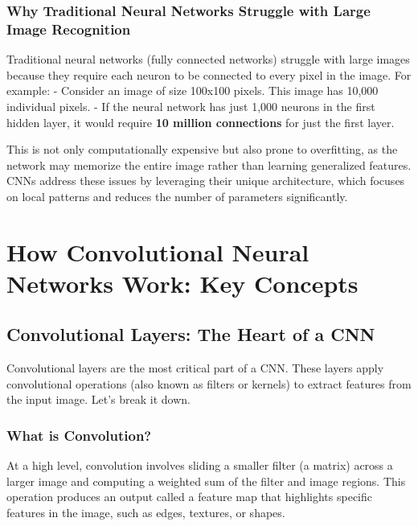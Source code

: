 \documentclass[
  letterpaper,
  DIV=11,
  numbers=noendperiod]{scrreprt}
\begin{document}
\subsubsection{Why Traditional Neural Networks Struggle with Large Image
Recognition}\label{why-traditional-neural-networks-struggle-with-large-image-recognition}

Traditional neural networks (fully connected networks) struggle with
large images because they require each neuron to be connected to every
pixel in the image. For example: - Consider an image of size 100x100
pixels. This image has 10,000 individual pixels. - If the neural network
has just 1,000 neurons in the first hidden layer, it would require
\textbf{10 million connections} for just the first layer.

This is not only computationally expensive but also prone to
overfitting, as the network may memorize the entire image rather than
learning generalized features. CNNs address these issues by leveraging
their unique architecture, which focuses on local patterns and reduces
the number of parameters significantly.

\section{How Convolutional Neural Networks Work: Key
Concepts}\label{how-convolutional-neural-networks-work-key-concepts}

\subsection{Convolutional Layers: The Heart of a
CNN}\label{convolutional-layers-the-heart-of-a-cnn}

Convolutional layers are the most critical part of a CNN. These layers
apply convolutional operations (also known as filters or kernels) to
extract features from the input image. Let's break it down.

\subsubsection{What is Convolution?}\label{what-is-convolution}

At a high level, convolution involves sliding a smaller filter (a
matrix) across a larger image and computing a weighted sum of the filter
and image regions. This operation produces an output called a feature
map that highlights specific features in the image, such as edges,
textures, or shapes.
\end{document}
